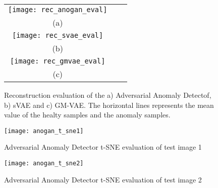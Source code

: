 \begin{figure}[h]
\begin{minipage}{\linewidth}
  \centering
  \begin{tabular}{ccc}
  \texttt{[image: rec\_anogan\_eval]} \\
  (a) \\ 
  \texttt{[image: rec\_svae\_eval]} \\
  (b) \\ 
  \texttt{[image: rec\_gmvae\_eval]}\\
  (c) \\
  \end{tabular}
  \end{minipage}
\caption[Reconstruction evaluation of the Adversarial Anomaly Detectof, sVAE and GM-VAE]{Reconstruction evaluation of the a) Adversarial Anomaly Detectof, b) sVAE and c) GM-VAE. The horizontal lines represents the mean value of the healty samples and the anomaly samples.}
\label{fig:rec_eval}
\end{figure}

\begin{figure}[htb]
  \centering
  \texttt{[image: anogan\_t\_sne1]}
  \caption[Adversarial Anomaly Detector t-SNE evaluation of test image 1]{Adversarial Anomaly Detector t-SNE evaluation of test image 1}
  \label{fig:anogan_eval_test_image_1}
\end{figure}

\begin{figure}[htb]
  \centering
  \texttt{[image: anogan\_t\_sne2]}
  \caption[Adversarial Anomaly Detector t-SNE evaluation of test image 2]{Adversarial Anomaly Detector t-SNE evaluation of test image 2}
  \label{fig:anogan_eval_test_image_2}
\end{figure}
